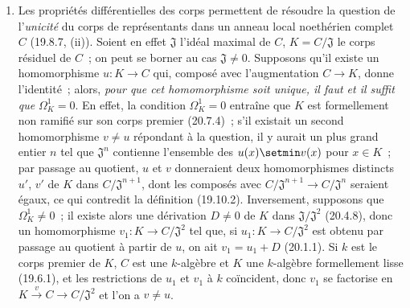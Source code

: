\begin{remarks}[21.5.3]
\label{0.21.5.3-fr}
\begin{enumerate}
  \item[(i)] Les propriétés différentielles des corps permettent de résoudre la
  question de l'\emph{unicité} du corps de représentants dans un anneau local
  noethérien complet $C$ (19.8.7, (ii)). Soient en effet $\mathfrak J$ l'idéal maximal
  de $C$, $K=C/\mathfrak J$ le corps résiduel de $C$~; on peut se borner au
  cas $\mathfrak J\ne0$. Supposons qu'il existe un homomorphisme $u:K\to C$
  qui, composé avec l'augmentation $C\to K$, donne l'identité~; alors, \emph{pour
  que cet homomorphisme soit unique, il faut et il suffit que}
  $\Omega^1_K=0$. En effet, la condition $\Omega^1_K=0$ entraîne que $K$ est
  formellement non ramifié sur son corps premier (20.7.4)~; s'il existait un
  second homomorphisme $v\ne u$ répondant à la question, il y aurait un plus
  grand entier $n$ tel que $\mathfrak J^n$ contienne l'ensemble des
  $u(x)\setmin v(x)$ pour $x\in K$~; par passage au quotient, $u$ et $v$ donneraient
  deux homomorphismes distincts $u'$, $v'$ de $K$ dans
  $C/\mathfrak J^{n+1}$, dont les composés avec
  $C/\mathfrak J^{n+1}\to C/\mathfrak J^n$ seraient égaux, ce qui contredit
  la définition (19.10.2). Inversement, supposons que $\Omega^1_K\ne0$~; il
  existe alors une dérivation $D\ne0$ de $K$ dans
  $\mathfrak J/\mathfrak J^2$ (20.4.8), donc un homomorphisme
  $v_1:K\to C/\mathfrak J^2$ tel que, si $u_1:K\to C/\mathfrak J^2$ est
  obtenu par passage au quotient à partir de $u$, on ait $v_1=u_1+D$
  (20.1.1). Si $k$ est le corps premier de $K$, $C$ est une $k$-algèbre et
  $K$ une $k$-algèbre formellement lisse (19.6.1), et les restrictions de
  $u_1$ et $v_1$ à $k$ coïncident, donc $v_1$ se factorise en
  $K\xrightarrow{v}C\to C/\mathfrak J^2$ et l'on a $v\ne u$.


\end{enumerate}
\end{remarks}
